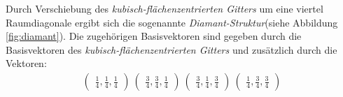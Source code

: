 Durch Verschiebung des \textit{kubisch-flächenzentrierten Gitters}
um eine viertel Raumdiagonale ergibt sich die sogenannte
\textit{Diamant-Struktur}(siehe Abbildung \ref{fig:diamant}).
Die zugehörigen Basisvektoren sind gegeben durch die
Basisvektoren des \textit{kubisch-flächenzentrierten Gitters}
und zusätzlich durch die Vektoren:
\begin{align}
   \label{eqn:4*}
   \begin{pmatrix}
    \frac{1}{4}, \frac{1}{4}, \frac{1}{4}
  \end{pmatrix}\
  \begin{pmatrix}
    \frac{3}{4}, \frac{3}{4}, \frac{1}{4}
  \end{pmatrix}\
  \begin{pmatrix}
    \frac{3}{4}, \frac{1}{4}, \frac{3}{4}
  \end{pmatrix}\
  \begin{pmatrix}
    \frac{1}{4}, \frac{3}{4}, \frac{3}{4}
  \end{pmatrix}
\end{align}

